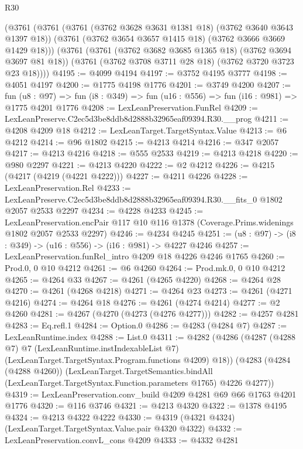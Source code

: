 \begin{lexlean}{R30}
\begin{coremodule}
    (@3761
      (@3761
        (@3761 (@3762 @3628 @3631 @1381 @18) (@3762 @3640 @3643 @1397 @18))
        (@3761 (@3762 @3654 @3657 @1415 @18) (@3762 @3666 @3669 @1429 @18)))
      (@3761
        (@3761 (@3762 @3682 @3685 @1365 @18) (@3762 @3694 @3697 @81 @18))
        (@3761 (@3762 @3708 @3711 @28 @18) (@3762 @3720 @3723 @23 @18))))
@4195 := @4099 @4194
@4197 := @3752 @4195 @3777
@4198 := @4051 @4197
@4200 := @1775 @4198 @1776
@4201 := @3749 @4200
@4207 := fun (u8 : @97) =>
  fun (i8 : @349) => fun (u16 : @556) => fun (i16 : @981) => @1775 @4201 @1776
@4208 := LexLeanPreservation.FunRel
@4209 := LexLeanPreserve.C2ec5d3be8ddb8d2888b32965eaf09394.R30.__prog
@4211 := @4208 @4209 @18
@4212 := LexLeanTarget.TargetSyntax.Value
@4213 := @6 @4212
@4214 := @96 @1802
@4215 := @4213 @4214
@4216 := @347 @2057
@4217 := @4213 @4216
@4218 := @555 @2533
@4219 := @4213 @4218
@4220 := @980 @2297
@4221 := @4213 @4220
@4222 := @2 @4212
@4226 := @4215 (@4217 (@4219 (@4221 @4222)))
@4227 := @4211 @4226
@4228 := LexLeanPreservation.Rel
@4233 := LexLeanPreserve.C2ec5d3be8ddb8d2888b32965eaf09394.R30.__fits_0 @1802 @2057 @2533 @2297
@4234 := @4228 @4233
@4245 := LexLeanPreservation.encPair
    @117
    @10
    @116
    @1378
    (Coverage.Prims.widenings @1802 @2057 @2533 @2297)
@4246 := @4234 @4245
@4251 := (u8 : @97) -> (i8 : @349) -> (u16 : @556) -> (i16 : @981) -> @4227 @4246
@4257 := LexLeanPreservation.funRel_intro @4209 @18 @4226 @4246 @1765
@4260 := Prod.{0, 0} @10 @4212
@4261 := @6 @4260
@4264 := Prod.mk.{0, 0} @10 @4212
@4265 := @4264 @33
@4267 := @4261 (@4265 @4220)
@4268 := @4264 @28
@4270 := @4261 (@4268 @4218)
@4271 := @4264 @23
@4273 := @4261 (@4271 @4216)
@4274 := @4264 @18
@4276 := @4261 (@4274 @4214)
@4277 := @2 @4260
@4281 := @4267 (@4270 (@4273 (@4276 @4277)))
@4282 := @4257 @4281
@4283 := Eq.refl.{1}
@4284 := Option.{0}
@4286 := @4283 (@4284 @7)
@4287 := LexLeanRuntime.index
@4288 := List.{0}
@4311 := @4282
    (@4286
      (@4287
        (@4288 @7)
        @7
        (LexLeanRuntime.instIndexableList @7)
        (LexLeanTarget.TargetSyntax.Program.functions @4209)
        @18))
    (@4283
      (@4284 (@4288 @4260))
      (LexLeanTarget.TargetSemantics.bindAll
        (LexLeanTarget.TargetSyntax.Function.parameters @1765)
        @4226
        @4277))
@4319 := LexLeanPreservation.conv_build @4209 @4281 @69 @66 @1763 @4201 @1776
@4320 := @116 @3746
@4321 := @4213 @4320
@4322 := @1378 @4195
@4324 := @4213 @4322 @4222
@4330 := @4319 (@4321 @4324) (LexLeanTarget.TargetSyntax.Value.pair @4320 @4322)
@4332 := LexLeanPreservation.convL_cons @4209
@4333 := @4332 @4281

\end{coremodule}
\end{lexlean}

